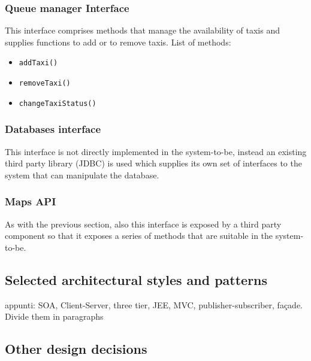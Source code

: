 \subsubsection{Queue manager Interface}
This interface comprises methods that manage the availability of taxis and supplies functions to add or to remove taxis. \newline
List of methods:
\begin{itemize}
	\item \texttt{addTaxi()}
	\item \texttt{removeTaxi()}
	\item \texttt{changeTaxiStatus()}
\end{itemize}
\subsubsection{Databases interface}
This interface is not directly implemented in the system-to-be, instead an existing third party library (JDBC) is used which supplies its own set of interfaces to the system that can manipulate the database.
\subsubsection{Maps API}
As with the previous section, also this interface is exposed by a third party component so that it exposes a series of methods that are suitable in the system-to-be.
\subsection{Selected architectural styles and patterns}
\label{sec:arch-styles-patterns}
appunti: SOA, Client-Server, three tier, JEE, MVC, publisher-subscriber, façade. Divide them in paragraphs
\subsection{Other design decisions}